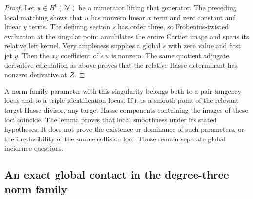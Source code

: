 \begin{proof}
Let $u\in H^0(\mathcal N)$ be a numerator lifting that generator.
The preceding local matching shows that $u$ has nonzero linear
$x$ term and zero constant and linear $y$ terms. The defining
section $s$ has order three, so Frobenius-twisted evaluation at
the singular point annihilates the entire Cartier image and
spans its relative left kernel. Very ampleness supplies a global
$\dot s$ with zero value and first jet $y$. Then the $xy$
coefficient of $\dot s\,u$ is nonzero. The same quotient
adjugate derivative calculation as above proves that the relative
Hasse determinant has nonzero derivative at $Z$.
\end{proof}

\begin{remark}\label{auto:A_monodromy:2b2a821f869e}

A norm-family parameter with this singularity belongs both to a
pair-tangency locus and to a triple-identification locus. If it is
a smooth point of the relevant target Hasse divisor, any target
Hasse components containing the images of these loci coincide.
The lemma proves that local smoothness under its stated hypotheses.
It does not prove the existence or dominance of such parameters,
or the irreducibility of the source collision loci. Those remain
separate global incidence questions.
\end{remark}


\subsection{An exact global contact in the degree-three norm family}
\label{subsec:ss-global-contact-witness}

